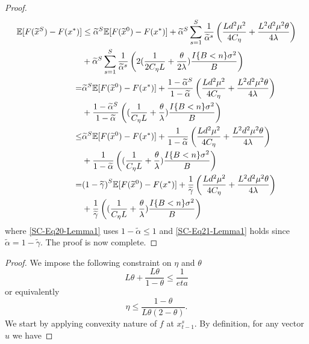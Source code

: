 \documentclass{article}
\newcommand*{\E}{\mathbb{E}}
\theoremstyle{definition}
\theoremstyle{remark}
\begin{document}
{\begin{proof}
\begin{align}
\E[F(\widetilde{x}^S) - F(x^*)] & \leq \widetilde{\alpha}^{S} \E[F(\widetilde{x}^0) - F({x}^*)] +\widetilde{\alpha}^{S} \sum_{s=1}^S \frac{1}{\widetilde{\alpha}^s}\left(\frac{Ld^2\mu^2}{4C_{\eta}}+\frac{ L^2d^2\mu^2\theta}{4\lambda}\right)\notag\\
&+\widetilde{\alpha}^{S} \sum_{s=1}^S \frac{1}{\widetilde{\alpha}^s}\left(2(\frac{1}{2C_{\eta} L}+\frac{\theta}{2\lambda})\frac{I\{B < n\} \sigma ^2}{B}\right)\notag\\
 =& \widetilde{\alpha}^{S} \E[F(\widetilde{x}^0) - F(x^*)]+\frac{1-\widetilde{\alpha}^S}{1-\widetilde{\alpha}}\left(\frac{Ld^2\mu^2}{4C_{\eta}}+\frac{ L^2d^2\mu^2\theta}{4\lambda}\right)\notag\\
&+ \frac{1-\widetilde{\alpha}^S}{1-\widetilde{\alpha}}\left((\frac{1}{C_{\eta} L}+\frac{\theta}{\lambda})\frac{I\{B < n\} \sigma ^2}{B}\right)\notag\\
 \leq& {\widetilde{\alpha}}^{S} \E[F(\widetilde{x}^0) - F(x^*)]+\frac{1}{1-\widetilde{\alpha}}\left(\frac{Ld^2\mu^2}{4C_{\eta}}+\frac{ L^2d^2\mu^2\theta}{4\lambda}\right)\notag\\
&+ \frac{1}{1-\widetilde{\alpha}}\left((\frac{1}{C_{\eta} L}+\frac{\theta}{\lambda})\frac{I\{B < n\} \sigma ^2}{B}\right)\label{SC-Eq20-Lemma1}\\
 =& {(1-\widetilde{\gamma})}^{S} \E[F(\widetilde{x}^0) - F(x^*)]+\frac{1}{{\widetilde{\gamma}}}\left(\frac{Ld^2\mu^2}{4C_{\eta}}+\frac{ L^2d^2\mu^2\theta}{4\lambda}\right)\notag\\
&+ \frac{1}{\widetilde{\gamma}}\left((\frac{1}{C_{\eta} L}+\frac{\theta}{\lambda})\frac{I\{B < n\} \sigma ^2}{B}\right)\label{SC-Eq21-Lemma1}
\end{align}
where \eqref{SC-Eq20-Lemma1} uses $1-\widetilde{\alpha} \leq 1$ and \eqref{SC-Eq21-Lemma1}  holds since $\widetilde{\alpha} = 1-\widetilde{\gamma}$. The proof is now complete.
\end{proof}
{\color{blue}
\begin{proof}
We impose the following constraint on $\eta$ and $\theta$
\[
L\theta +\frac{L\theta}{1-\theta}\leq \frac{1}{eta}
\]
or equivalently 
\begin{equation}\label{c-eq-noneta}
\eta \leq \frac{1-\theta}{L\theta(2-\theta)}.
\end{equation}
We start by applying convexity nature of $f$ at $x_{t-1}^s$. By definition, for any vector $u$ we have 


\end{proof}}}
\end{document}
